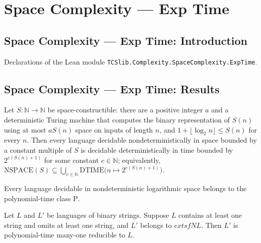 \section{Space Complexity --- Exp Time}
\subsection*{Space Complexity --- Exp Time: Introduction}

Declarations of the Lean module \texttt{TCSlib.Complexity.SpaceComplexity.ExpTime}.

\subsection*{Space Complexity --- Exp Time: Results}

\begin{theorem}
\label{Complexity.NSPACE_subset_exp_dtime}
\leanok
{}
Let $S:\mathbb{N}\to\mathbb{N}$ be space-constructible: there are a positive integer $a$
and a deterministic Turing machine that computes the binary representation of $S(n)$
using at most $aS(n)$ space on inputs of length $n$, and $1+\lfloor\log_2 n\rfloor\le
S(n)$ for every $n$. Then every language decidable nondeterministically in space bounded
by a constant multiple of $S$ is decidable deterministically in time bounded by
$2^{c(S(n)+1)}$ for some constant $c\in\mathbb{N}$; equivalently,
$\mathrm{NSPACE}(S)\subseteq\bigcup_{c\in\mathbb{N}}\mathrm{DTIME}\bigl(n\mapsto
2^{c(S(n)+1)}\bigr)$.
\end{theorem}

\begin{theorem}
\label{Complexity.NL_subset_P}
\leanok
{}
Every language decidable in nondeterministic logarithmic space belongs to the
polynomial-time class $\mathrm{P}$.
\end{theorem}

\begin{theorem}
\label{Complexity.polyTimeReducible_of_mem_NL}
\leanok
{}
Let $L$ and $L'$ be languages of binary strings. Suppose $L$ contains at least one
string and omits at least one string, and $L'$ belongs to $	extsf{NL}$. Then $L'$ is
polynomial-time many-one reducible to $L$.
\end{theorem}
